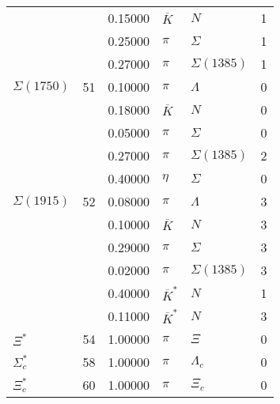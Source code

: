 \documentclass[a4paper,10pt]{article}
\begin{document}
\begin{tabular}[t]{|lr|l|ll|l|}
$                    $&   & 0.15000&$ \overline{K}        $ &$ N                   $& 1\\
$                    $&   & 0.25000&$ \pi                 $ &$ \Sigma              $& 1\\
$                    $&   & 0.27000&$ \pi                 $ &$ \Sigma(1385)        $& 1\\
\hline
$      \Sigma(1750)  $& 51& 0.10000&$ \pi                 $ &$ \Lambda             $& 0\\
$                    $&   & 0.18000&$ \overline{K}        $ &$ N                   $& 0\\
$                    $&   & 0.05000&$ \pi                 $ &$ \Sigma              $& 0\\
$                    $&   & 0.27000&$ \pi                 $ &$ \Sigma(1385)        $& 2\\
$                    $&   & 0.40000&$ \eta                $ &$ \Sigma              $& 0\\
\hline
$      \Sigma(1915)  $& 52& 0.08000&$ \pi                 $ &$ \Lambda             $& 3\\
$                    $&   & 0.10000&$ \overline{K}        $ &$ N                   $& 3\\
$                    $&   & 0.29000&$ \pi                 $ &$ \Sigma              $& 3\\
$                    $&   & 0.02000&$ \pi                 $ &$ \Sigma(1385)        $& 3\\
$                    $&   & 0.40000&$ \overline{K}^*      $ &$ N                   $& 1\\
$                    $&   & 0.11000&$ \overline{K}^*      $ &$ N                   $& 3\\
\hline
$      \Xi^*         $& 54& 1.00000&$ \pi                 $ &$ \Xi                 $& 0\\
\hline
$      \Sigma_c^*    $& 58& 1.00000&$ \pi                 $ &$ \Lambda_c           $& 0\\
\hline
$      \Xi_c^*       $& 60& 1.00000&$ \pi                 $ &$ \Xi_c               $& 0\\
\hline
\end{tabular}
\end{document}

